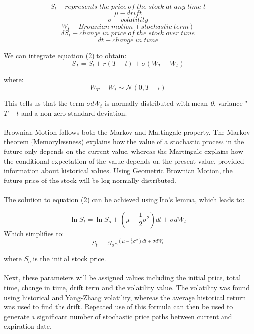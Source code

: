 $$S_{t} - represents\; the\; price\; of\; the\; stock\; at\; any\; time\; t$$
$$\mu - drift$$
$$\sigma - volatility$$
$$W_{t} - Brownian\; motion\; (stochastic\; term)$$
$$dS_{t} - change\; in\; price\; of \;the \;stock\; over\; time$$
$$dt - change \;in \;time$$

 
We can integrate equation (2) to obtain:
\begin{equation}
   S_{T} = S_{t}+ r(T-t) + \sigma (W_{T}-W_{t})
\end{equation}
 
 where:
 \begin{equation} 
 W_{T}-W_{t} \sim \mathcal{N}(0,T-t)
 \end{equation}
 
 This tells us that the term $\sigma dW_{t}$ is normally distributed with mean \textit{0}, variance "$T-t$ and a non-zero standard deviation. 
 
\paragraph{}
 
Brownian Motion follows both the Markov and Martingale property. The Markov  theorem (Memorylessness) explains how the value of a stochastic process in the future only depends on the current value, whereas the Martingale explains how the conditional expectation of the value depends on the present value, provided information about historical values. Using Geometric Brownian Motion, the future price of the stock will be log normally distributed. 
\paragraph{}
 
The solution to equation (2) can be achieved using Ito's lemma, which leads to:
 
\begin{equation}
    \ln{S_{t} = \ln{S_{o} + \left(\mu - \frac{1}{2}\sigma^2\right)dt+\sigma dW_{t}}}
\end{equation}
  Which simplifies to:
  \begin{equation}
    S_{t} = S_{o}e^{\left(\mu - \frac{1}{2}\sigma^2\right)dt+\sigma dW_{t}}
  \end{equation}
 
 where $S_{o}$ is the initial stock price.

 \paragraph{}
 Next, these parameters will be assigned values including the initial price, total time, change in time, drift term and the volatility value. The volatility was found using historical and Yang-Zhang volatility, whereas the average historical return was used to find the drift.  Repeated use of this formula can then be used to generate a significant number of stochastic price paths between current and expiration date.
 
